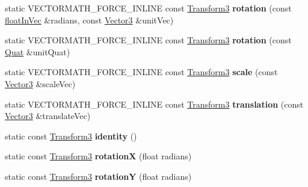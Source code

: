 \begin{DoxyCompactItemize}
static V\+E\+C\+T\+O\+R\+M\+A\+T\+H\+\_\+\+F\+O\+R\+C\+E\+\_\+\+I\+N\+L\+I\+NE const \hyperlink{classVectormath_1_1Aos_1_1Transform3}{Transform3} {\bfseries rotation} (const \hyperlink{classVectormath_1_1floatInVec}{float\+In\+Vec} \&radians, const \hyperlink{classVectormath_1_1Aos_1_1Vector3}{Vector3} \&unit\+Vec)
\item 
\mbox{\label{classVectormath_1_1Aos_1_1Transform3_a477f22e7a915190292f72b2a1ba5a42a}} 
static V\+E\+C\+T\+O\+R\+M\+A\+T\+H\+\_\+\+F\+O\+R\+C\+E\+\_\+\+I\+N\+L\+I\+NE const \hyperlink{classVectormath_1_1Aos_1_1Transform3}{Transform3} {\bfseries rotation} (const \hyperlink{classVectormath_1_1Aos_1_1Quat}{Quat} \&unit\+Quat)
\item 
\mbox{\label{classVectormath_1_1Aos_1_1Transform3_a6edc040c9a3f332f1ca9905c137f3bcc}} 
static V\+E\+C\+T\+O\+R\+M\+A\+T\+H\+\_\+\+F\+O\+R\+C\+E\+\_\+\+I\+N\+L\+I\+NE const \hyperlink{classVectormath_1_1Aos_1_1Transform3}{Transform3} {\bfseries scale} (const \hyperlink{classVectormath_1_1Aos_1_1Vector3}{Vector3} \&scale\+Vec)
\item 
\mbox{\label{classVectormath_1_1Aos_1_1Transform3_a01963970d9591b93326d61284a7b1f41}} 
static V\+E\+C\+T\+O\+R\+M\+A\+T\+H\+\_\+\+F\+O\+R\+C\+E\+\_\+\+I\+N\+L\+I\+NE const \hyperlink{classVectormath_1_1Aos_1_1Transform3}{Transform3} {\bfseries translation} (const \hyperlink{classVectormath_1_1Aos_1_1Vector3}{Vector3} \&translate\+Vec)
\item 
\mbox{\label{classVectormath_1_1Aos_1_1Transform3_aa39abe6803b36abd76c62b32733eac12}} 
static const \hyperlink{classVectormath_1_1Aos_1_1Transform3}{Transform3} {\bfseries identity} ()
\item 
\mbox{\label{classVectormath_1_1Aos_1_1Transform3_a3fecbfc88cc745ea3c64c49e82fba770}} 
static const \hyperlink{classVectormath_1_1Aos_1_1Transform3}{Transform3} {\bfseries rotationX} (float radians)
\item 
\mbox{\label{classVectormath_1_1Aos_1_1Transform3_a0f8183a3bde8e16d1c257db59f94a9fc}} 
static const \hyperlink{classVectormath_1_1Aos_1_1Transform3}{Transform3} {\bfseries rotationY} (float radians)

\end{DoxyCompactItemize}
